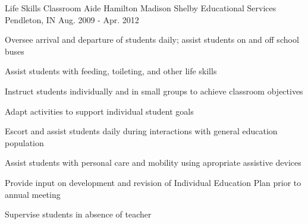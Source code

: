 \begin{cventries}
  \cventry
    {Life Skills Classroom Aide} %
    {Hamilton Madison Shelby Educational Services} %
    {Pendleton, IN} %
    {Aug. 2009 - Apr. 2012} %
    {
      \begin{cvitems} %
        \item {Oversee arrival and departure of students daily; assist students on and off school buses}
        \item {Assist students with feeding, toileting, and other life skills}
        \item {Instruct students individually and in small groups to achieve classroom objectives}
        \item {Adapt activities to support individual student goals}
        \item {Escort and assist students daily during interactions with general education population}
        \item {Assist students with personal care and mobility using apropriate assistive devices}
        \item {Provide input on development and revision of Individual Education Plan prior to annual meeting}
        \item {Supervise students in absence of teacher}
      \end{cvitems}
    }

\end{cventries}
